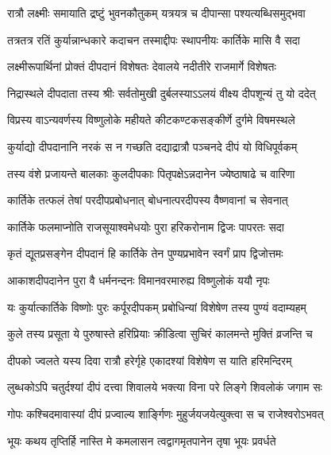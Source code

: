 \twolineshloka
{रात्रौ लक्ष्मीः समायाति द्रष्टुं भुवनकौतुकम्}
{यत्रयत्र च दीपान्सा पश्यत्यब्धिसमुद्भवा} %

\twolineshloka
{तत्रतत्र रतिं कुर्यान्नान्धकारे कदाचन}
{तस्माद्दीपः स्थापनीयः कार्तिके मासि वै सदा} %

\twolineshloka
{लक्ष्मीरूपार्थिनां प्रोक्तं दीपदानं विशेषतः}
{देवालये नदीतीरे राजमार्गे विशेषतः} %

\twolineshloka
{निद्रास्थले दीपदाता तस्य श्रीः सर्वतोमुखी}
{दुर्बलस्याऽऽलयं वीक्ष्य दीपशून्यं तु यो ददेत्} %

\twolineshloka
{विप्रस्य वाऽन्यवर्णस्य विष्णुलोके महीयते}
{कीटकण्टकसङ्कीर्णे दुर्गमे विषमस्थले} %

\twolineshloka
{कुर्याद्यो दीपदानानि नरकं स न गच्छति}
{दद्याद्रात्रौ पञ्चनदे दीपं यो विधिपूर्वकम्} %

\twolineshloka
{तस्य वंशे प्रजायन्ते बालकाः कुलदीपकाः}
{पितृपक्षेऽन्नदानेन ज्येष्ठाषाढे च वारिणा} %

\twolineshloka
{कार्तिके तत्फलं तेषां परदीपप्रबोधनात्}
{बोधनात्परदीपस्य वैष्णवानां च सेवनात्} %

\twolineshloka
{कार्तिके फलमाप्नोति राजसूयाश्वमेधयोः}
{पुरा हरिकरोनाम द्विजः पापरतः सदा} %

\twolineshloka
{कृतं द्यूतप्रसङ्गेन दीपदानं हि कार्तिके}
{तेन पुण्यप्रभावेन स्वर्गं प्राप द्विजोत्तमः} %

\twolineshloka
{आकाशदीपदानेन पुरा वै धर्मनन्दनः}
{विमानवरमारुह्य विष्णुलोकं ययौ नृपः} %

\twolineshloka
{यः कुर्यात्कार्तिके विष्णोः पुरः कर्पूरदीपकम्}
{प्रबोधिन्यां विशेषेण तस्य पुण्यं वदाम्यहम्} %

\twolineshloka
{कुले तस्य प्रसूता ये पुरुषास्ते हरिप्रियाः}
{क्रीडित्वा सुचिरं कालमन्ते मुक्तिं व्रजन्ति च} %

\twolineshloka
{दीपको ज्वलते यस्य दिवा रात्रौ हरेर्गृहे}
{एकादश्यां विशेषेण स याति हरिमन्दिरम्} %

\twolineshloka
{लुब्धकोऽपि चतुर्दश्यां दीपं दत्त्वा शिवालये}
{भक्त्या विना परे लिङ्गे शिवलोकं जगाम सः} %

\twolineshloka
{गोपः कश्चिदमावास्यां दीपं प्रज्वाल्य शार्ङ्गिणः}
{मुहुर्जयजयेत्युक्त्वा स च राजेश्वरोऽभवत्} %





\twolineshloka
{भूयः कथय तृप्तिर्हि नास्ति मे कमलासन}
{त्वद्वागमृतपानेन तृषा भूयः प्रवर्धते} %


